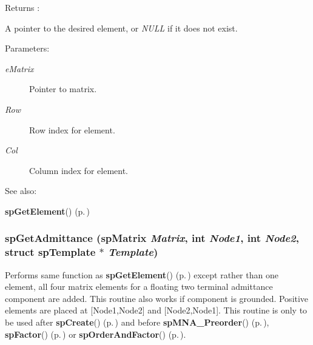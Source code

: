 \begin{Desc}
\item[Returns :]\par
 A pointer to the desired element, or {\em NULL} if it does not exist.\end{Desc}
\begin{Desc}
\item[Parameters: ]\par
\begin{description}
\item[{\em 
e\-Matrix}]Pointer to matrix. \item[{\em 
Row}]Row index for element. \item[{\em 
Col}]Column index for element.\end{description}
\end{Desc}
\begin{Desc}
\item[See also: ]\par
{\bf sp\-Get\-Element}() {\rm (p.\,\pageref{spBuild_8c_a12})} \end{Desc}
\subsubsection{ sp\-Get\-Admittance ({\bf sp\-Matrix} {\em Matrix}, int {\em Node1}, int {\em Node2}, struct {\bf sp\-Template} $\ast$ {\em Template})}\label{spBuild_8c_a13}


Performs same function as {\bf sp\-Get\-Element}() {\rm (p.\,\pageref{spBuild_8c_a12})} except rather than one element, all four matrix elements for a floating two terminal admittance component are added. This routine also works if component is grounded. Positive elements are placed at [Node1,Node2] and [Node2,Node1]. This routine is only to be used after {\bf sp\-Create}() {\rm (p.\,\pageref{spAllocate_8c_a11})} and before {\bf sp\-MNA\_\-Preorder}() {\rm (p.\,\pageref{spUtils_8c_a11})}, {\bf sp\-Factor}() {\rm (p.\,\pageref{spFactor_8c_a25})} or {\bf sp\-Order\-And\-Factor}() {\rm (p.\,\pageref{spFactor_8c_a24})}.

